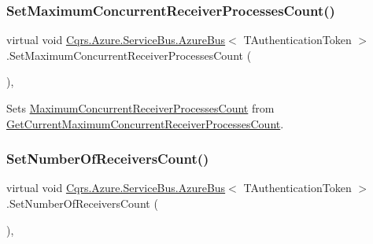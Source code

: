 \subsubsection{\texorpdfstring{Set\+Maximum\+Concurrent\+Receiver\+Processes\+Count()}{SetMaximumConcurrentReceiverProcessesCount()}}
{\footnotesize\ttfamily virtual void \hyperlink{classCqrs_1_1Azure_1_1ServiceBus_1_1AzureBus}{Cqrs.\+Azure.\+Service\+Bus.\+Azure\+Bus}$<$ T\+Authentication\+Token $>$.Set\+Maximum\+Concurrent\+Receiver\+Processes\+Count (\begin{DoxyParamCaption}{ }\end{DoxyParamCaption})\hspace{0.3cm}{\ttfamily [protected]}, {\ttfamily [virtual]}}



Sets \hyperlink{classCqrs_1_1Azure_1_1ServiceBus_1_1AzureBus_a6b517888d91c6a5b026cb5857e75a04f_a6b517888d91c6a5b026cb5857e75a04f}{Maximum\+Concurrent\+Receiver\+Processes\+Count} from \hyperlink{classCqrs_1_1Azure_1_1ServiceBus_1_1AzureBus_adfed2926ff68eff521e8c64c02cca2a6_adfed2926ff68eff521e8c64c02cca2a6}{Get\+Current\+Maximum\+Concurrent\+Receiver\+Processes\+Count}. 

\mbox{\label{classCqrs_1_1Azure_1_1ServiceBus_1_1AzureBus_a7633f211059ee45dfb907b16a955a790_a7633f211059ee45dfb907b16a955a790}} 
\subsubsection{\texorpdfstring{Set\+Number\+Of\+Receivers\+Count()}{SetNumberOfReceiversCount()}}
{\footnotesize\ttfamily virtual void \hyperlink{classCqrs_1_1Azure_1_1ServiceBus_1_1AzureBus}{Cqrs.\+Azure.\+Service\+Bus.\+Azure\+Bus}$<$ T\+Authentication\+Token $>$.Set\+Number\+Of\+Receivers\+Count (\begin{DoxyParamCaption}{ }\end{DoxyParamCaption})\hspace{0.3cm}{\ttfamily [protected]}, {\ttfamily [virtual]}}



